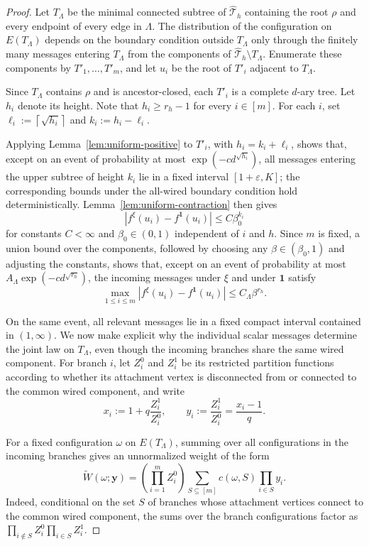 \documentclass[11pt]{amsart}
\theoremstyle{plain}
\theoremstyle{definition}
\theoremstyle{remark}
\newcommand{\dreg}{\widehat {\mathcal T}_h}
\begin{document}
\begin{proof}
Let $T_\Lambda$ be the minimal connected subtree of $\dreg$ containing the root $\rho$ and every endpoint of every edge in $\Lambda$. The distribution of the configuration on $E(T_\Lambda)$ depends on the boundary condition outside $T_\Lambda$ only through the finitely many messages entering $T_\Lambda$ from the components of $\dreg\setminus T_\Lambda$. Enumerate these components by $T'_1,\ldots,T'_m$, and let $u_i$ be the root of $T'_i$ adjacent to $T_\Lambda$.

Since $T_\Lambda$ contains $\rho$ and is ancestor-closed, each $T'_i$ is a complete $d$-ary tree. Let $h_i$ denote its height. Note that $h_i\ge r_h-1$ for every $i\in[m]$. For each $i$, set $\ell_i:=\left\lceil\sqrt{h_i}\right\rceil$ and $k_i:=h_i-\ell_i$. 

Applying Lemma~\ref{lem:uniform-positive} to $T'_i$, with $h_i=k_i+\ell_i$, shows that, except on an event of probability at most $\exp(-c d^{\sqrt{h_i}})$, all messages entering the upper subtree of height $k_i$ lie in a fixed interval $[1+\varepsilon,K]$; the corresponding bounds under the all-wired boundary condition hold deterministically. Lemma~\ref{lem:uniform-contraction} then gives
\[
    \left|
        f^\xi(u_i)-f^{\mathbf 1}(u_i)
    \right|
    \le
    C\beta_0^{k_i}
\]
for constants $C<\infty$ and $\beta_0\in(0,1)$ independent of $i$ and $h$. Since $m$ is fixed, a union bound over the components, followed by choosing any $\beta\in(\beta_0,1)$ and adjusting the constants, shows that, except on an event of probability at most $A_\Lambda\exp\left(-c d^{\sqrt{r_h}}\right)$, the incoming messages under $\xi$ and under $\mathbf 1$ satisfy
\[
    \max_{1\le i\le m}
    \left|
        f^\xi(u_i)-f^{\mathbf 1}(u_i)
    \right|
    \le
    C_\Lambda\beta^{r_h}.
\]

On the same event, all relevant messages lie in a fixed compact interval contained in $(1,\infty)$. We now make explicit why the individual scalar messages determine the joint law on $T_\Lambda$, even though the incoming branches share the same wired component. For branch $i$, let $Z_i^0$ and $Z_i^1$ be its restricted partition functions according to whether its attachment vertex is disconnected from or connected to the common wired component, and write
\[
    x_i
    :=
    1+q\frac{Z_i^1}{Z_i^0},
    \qquad
    y_i
    :=
    \frac{Z_i^1}{Z_i^0}
    =
    \frac{x_i-1}{q}.
\]

For a fixed configuration $\omega$ on $E(T_\Lambda)$, summing over all configurations in the incoming branches gives an unnormalized weight of the form
\[
    \widetilde W(\omega;\mathbf y)
    =
    \left(\prod_{i=1}^m Z_i^0\right)
    \sum_{S\subseteq[m]}
    c(\omega,S)
    \prod_{i\in S}y_i.
\]
Indeed, conditional on the set $S$ of branches whose attachment vertices connect to the common wired component, the sums over the branch configurations factor as
$\prod_{i\notin S}Z_i^0\prod_{i\in S}Z_i^1$.


\end{proof}
\end{document}

